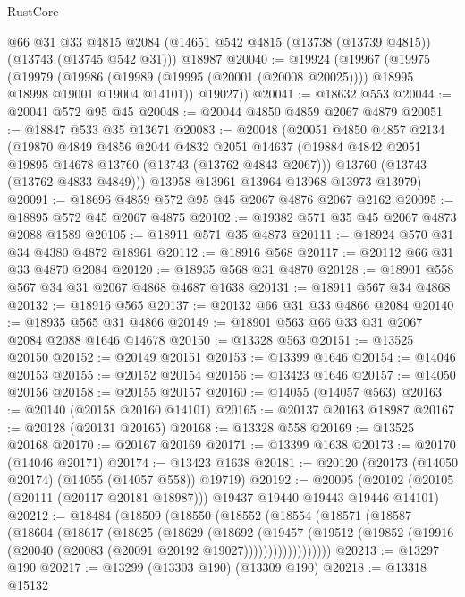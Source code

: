 \begin{lexlean}{RustCore}
\begin{coremodule}
    @66
    @31
    @33
    @4815
    @2084
    (@14651 @542 @4815 (@13738 (@13739 @4815)) (@13743 (@13745 @542 @31)))
    @18987
@20040 := @19924
    (@19967
      (@19975
        (@19979
          (@19986 (@19989 (@19995 (@20001 (@20008 @20025)))) @18995 @18998 @19001 @19004 @14101))
        @19027))
@20041 := @18632 @553
@20044 := @20041 @572 @95 @45
@20048 := @20044 @4850 @4859 @2067 @4879
@20051 := @18847 @533 @35 @13671
@20083 := @20048
    (@20051
      @4850
      @4857
      @2134
      (@19870
        @4849
        @4856
        @2044
        @4832
        @2051
        @14637
        (@19884 @4842 @2051 @19895 @14678 @13760 (@13743 (@13762 @4843 @2067)))
        @13760
        (@13743 (@13762 @4833 @4849)))
      @13958
      @13961
      @13964
      @13968
      @13973
      @13979)
@20091 := @18696 @4859 @572 @95 @45 @2067 @4876 @2067 @2162
@20095 := @18895 @572 @45 @2067 @4875
@20102 := @19382 @571 @35 @45 @2067 @4873 @2088 @1589
@20105 := @18911 @571 @35 @4873
@20111 := @18924 @570 @31 @34 @4380 @4872 @18961
@20112 := @18916 @568
@20117 := @20112 @66 @31 @33 @4870 @2084
@20120 := @18935 @568 @31 @4870
@20128 := @18901 @558 @567 @34 @31 @2067 @4868 @4687 @1638
@20131 := @18911 @567 @34 @4868
@20132 := @18916 @565
@20137 := @20132 @66 @31 @33 @4866 @2084
@20140 := @18935 @565 @31 @4866
@20149 := @18901 @563 @66 @33 @31 @2067 @2084 @2088 @1646 @14678
@20150 := @13328 @563
@20151 := @13525 @20150
@20152 := @20149 @20151
@20153 := @13399 @1646
@20154 := @14046 @20153
@20155 := @20152 @20154
@20156 := @13423 @1646
@20157 := @14050 @20156
@20158 := @20155 @20157
@20160 := @14055 (@14057 @563)
@20163 := @20140 (@20158 @20160 @14101)
@20165 := @20137 @20163 @18987
@20167 := @20128 (@20131 @20165)
@20168 := @13328 @558
@20169 := @13525 @20168
@20170 := @20167 @20169
@20171 := @13399 @1638
@20173 := @20170 (@14046 @20171)
@20174 := @13423 @1638
@20181 := @20120 (@20173 (@14050 @20174) (@14055 (@14057 @558)) @19719)
@20192 := @20095
    (@20102 (@20105 (@20111 (@20117 @20181 @18987))) @19437 @19440 @19443 @19446 @14101)
@20212 := @18484
    (@18509
      (@18550
        (@18552
          (@18554
            (@18571
              (@18587
                (@18604
                  (@18617
                    (@18625
                      (@18629
                        (@18692
                          (@19457
                            (@19512
                              (@19852
                                (@19916 (@20040 (@20083 (@20091 @20192 @19027))))))))))))))))))
@20213 := @13297 @190
@20217 := @13299 (@13303 @190) (@13309 @190)
@20218 := @13318 @15132

\end{coremodule}
\end{lexlean}
